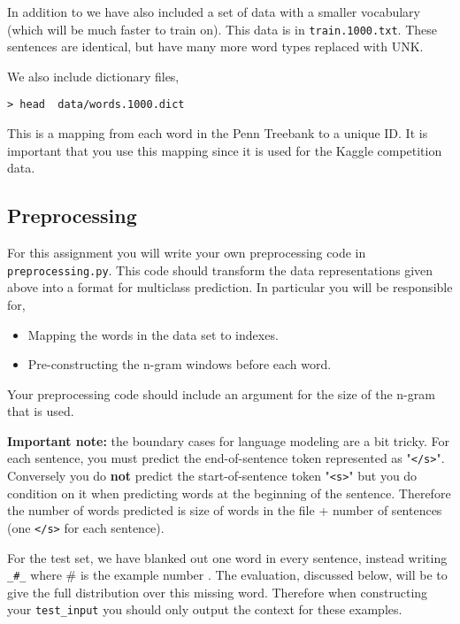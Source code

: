 \documentclass[11pt]{article}
\begin{document}
In addition to we have also included a set of data with a smaller vocabulary (which 
will be much faster to train on). This data is in \texttt{train.1000.txt}. 
These sentences are identical, but have many more word types replaced with UNK.

We also include dictionary files, 

\begin{verbatim}
> head  data/words.1000.dict 
\end{verbatim}

This is a mapping from each word in the Penn Treebank to
a unique ID. It is important that you use this mapping since it 
is used for the Kaggle competition data. 

\subsection{Preprocessing}

For this assignment you will write your own preprocessing code
in \texttt{preprocessing.py}. This code should transform the
data representations given above into a format for multiclass
prediction. In particular you will be responsible for,

\begin{itemize}
\item Mapping the words in the data set to indexes.
\item Pre-constructing the n-gram windows before each word.
\end{itemize}

Your preprocessing code should include an argument for the size of 
the n-gram that is used.

\textbf{Important note:} the boundary cases for language modeling are
a bit tricky. For each sentence, you must predict the end-of-sentence
token represented as "\texttt{</s>}". Conversely you do \textbf{not} predict the
start-of-sentence token "\texttt{<s>}" but you do condition on it when
predicting words at the beginning of the sentence. Therefore the
number of words predicted is size of words in the file + number of
sentences (one \texttt{</s>} for each sentence).


For the test set, we have blanked out one word in every sentence,
instead writing \texttt{\_\#\_} where \# is the example number .  The
evaluation, discussed below, will be to give the full distribution
over this missing word. Therefore when constructing your \texttt{test\_input}
you should only output the context for these examples.
\end{document}
